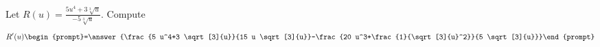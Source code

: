 \documentclass{ximera}
\author{Bart Snapp}
\begin{document}
\begin{exercise}
Let $R(u) = \frac{ 5 u^4+3 \sqrt[3]{u}}{-5 \sqrt[3]{u}}$. Compute
\[
R'(u)
\begin{prompt}=\answer{\frac{5 u^4+3 \sqrt[3]{u}}{15 u \sqrt[3]{u}}-\frac{20 u^3+\frac{1}{\sqrt[3]{u}^2}}{5 \sqrt[3]{u}}}\end{prompt}
\]
\end{exercise}
\end{document}
